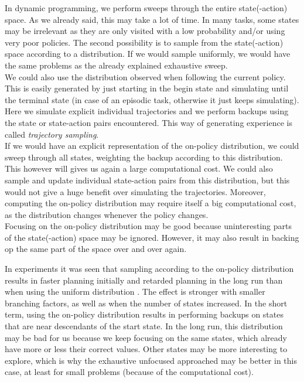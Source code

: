 \documentclass[a4paper]{article}
\begin{document}
In dynamic programming, we perform sweeps through the entire state(-action) space. As we already said, this may take a lot of time. In many tasks, some states may be irrelevant as they are only visited with a low probability and/or using very poor policies. The second possibility is to sample from the state(-action) space according to a distribution. If we would sample uniformly, we would have the same problems as the already explained exhaustive sweep.\\
We could also use the distribution observed when following the current policy. This is easily generated by just starting in the begin state and simulating until the terminal state (in case of an episodic task, otherwise it just keeps simulating). Here we simulate explicit individual trajectories and we perform backups using the state or state-action pairs encountered. This way of generating experience is called \textit{trajectory sampling}.\\
If we would have an explicit representation of the on-policy distribution, we could sweep through all states, weighting the backup according to this distribution. This however will gives us again a large computational cost. We could also sample and update individual state-action pairs from this distribution, but this would not give a huge benefit over simulating the trajectories. Moreover, computing the on-policy distribution may require itself a big computational cost, as the distribution changes whenever the policy changes.\\
Focusing on the on-policy distribution may be good because uninteresting parts of the state(-action) space may be ignored. However, it may also result in backing op the same part of the space over and over again. 

In experiments it was seen that sampling according to the on-policy distribution results in faster planning initially and retarded planning in the long run than when using the uniform distribution \citep{ML}. The effect is stronger with smaller branching factors, as well as when the number of states increased. In the short term, using the on-policy distribution results in performing backups on states that are near descendants of the start state. In the long run, this distribution may be bad for us because we keep focusing on the same states, which already have more or less their correct values. Other states may be more interesting to explore, which is why the exhaustive unfocused approached may be better in this case, at least for small problems (because of the computational cost).\\
\end{document}
